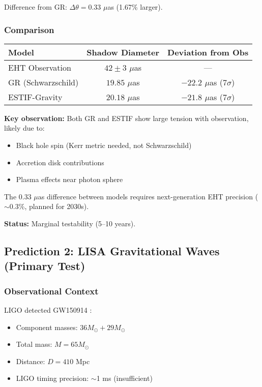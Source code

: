 \documentclass[12pt]{article}
\begin{document}
Difference from GR: $\Delta\theta = 0.33$ $\mu$as (1.67\% larger).

\subsubsection{Comparison}

\begin{center}
\begin{tabular}{lcc}
\hline
Model & Shadow Diameter & Deviation from Obs \\
\hline
EHT Observation & $42 \pm 3$ $\mu$as & --- \\
GR (Schwarzschild) & $19.85$ $\mu$as & $-22.2$ $\mu$as (7$\sigma$) \\
ESTIF-Gravity & $20.18$ $\mu$as & $-21.8$ $\mu$as (7$\sigma$) \\
\hline
\end{tabular}
\end{center}

\textbf{Key observation:} Both GR and ESTIF show large tension with observation, likely due to:
\begin{itemize}
    \item Black hole spin (Kerr metric needed, not Schwarzschild)
    \item Accretion disk contributions
    \item Plasma effects near photon sphere
\end{itemize}

The 0.33 $\mu$as difference between models requires next-generation EHT precision ($\sim$0.3\%, planned for 2030s).

\textbf{Status:} Marginal testability (5--10 years).

\subsection{Prediction 2: LISA Gravitational Waves (Primary Test)}

\subsubsection{Observational Context}

LIGO detected GW150914 \cite{Abbott2016}:
\begin{itemize}
    \item Component masses: $36 M_\odot + 29 M_\odot$
    \item Total mass: $M = 65 M_\odot$
    \item Distance: $D = 410$ Mpc
    \item LIGO timing precision: $\sim$1 ms (insufficient)
\end{itemize}
\end{document}
